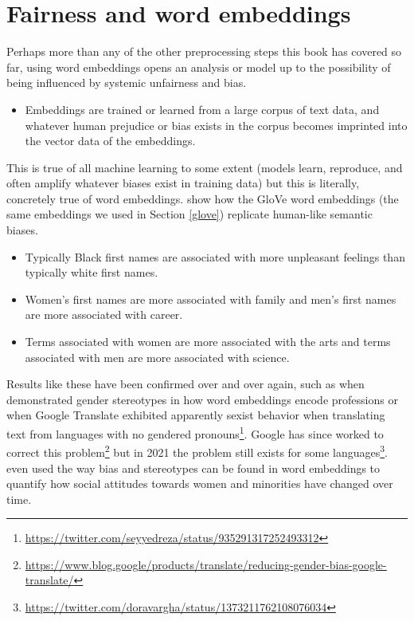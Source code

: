 \documentclass[
]{krantz}
\DeclareRobustCommand{\href}[2]{#2\footnote{\url{#1}}}
\renewcommand{\href}[2]{#2\footnote{\url{#1}}}
\newenvironment{rmdblock}[1]
  {\begin{shaded*}
  \begin{itemize}[left = -1cm, labelsep = 1cm]
  \renewcommand{\labelitemi}{
    \raisebox{-.7\height}[0pt][0pt]{
      {\setkeys{Gin}{width=3em,keepaspectratio}\texttt{[image: images/\#1]}}
    }
  }
 
  \item
  }
  {
  \end{itemize}
  \end{shaded*}
  }
\newenvironment{rmdwarning}
  {\begin{rmdblock}{warning}}
  {\end{rmdblock}}
\begin{document}

\hypertarget{fairnessembeddings}{%
\section{Fairness and word embeddings}\label{fairnessembeddings}}

Perhaps more than any of the other preprocessing steps this book has covered so far, using word embeddings opens an analysis or model up to the possibility of being influenced by systemic unfairness and bias.


\begin{rmdwarning}
Embeddings are trained or learned from a large corpus of text data, and
whatever human prejudice or bias exists in the corpus becomes imprinted
into the vector data of the embeddings.
\end{rmdwarning}

This is true of all machine learning to some extent (models learn, reproduce, and often amplify whatever biases exist in training data) but this is literally, concretely true of word embeddings. \citet{Caliskan2016} show how the GloVe word embeddings (the same embeddings we used in Section \ref{glove}) replicate human-like semantic biases.

\begin{itemize}
\item
  Typically Black first names are associated with more unpleasant feelings than typically white first names.
\item
  Women's first names are more associated with family and men's first names are more associated with career.
\item
  Terms associated with women are more associated with the arts and terms associated with men are more associated with science.
\end{itemize}

Results like these have been confirmed over and over again, such as when \citet{Bolukbasi2016} demonstrated gender stereotypes in how word embeddings encode professions or when Google Translate \href{https://twitter.com/seyyedreza/status/935291317252493312}{exhibited apparently sexist behavior when translating text from languages with no gendered pronouns}. Google has since \href{https://www.blog.google/products/translate/reducing-gender-bias-google-translate/}{worked to correct this problem} but in 2021 the problem \href{https://twitter.com/doravargha/status/1373211762108076034}{still exists for some languages}. \citet{Garg2018} even used the way bias and stereotypes can be found in word embeddings to quantify how social attitudes towards women and minorities have changed over time.
\end{document}
